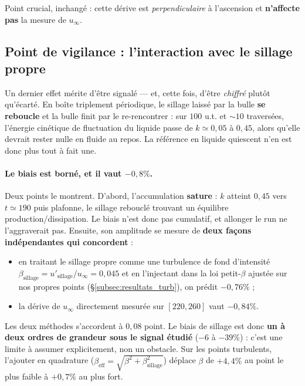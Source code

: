 Point crucial, inchangé : cette dérive est \emph{perpendiculaire} à l'ascension et
\textbf{n'affecte pas} la mesure de $u_\infty$.

\subsection{Point de vigilance : l'interaction avec le sillage propre}

Un dernier effet mérite d'être signalé --- et, cette fois, d'être \emph{chiffré}
plutôt qu'écarté. En boîte triplement périodique, le sillage laissé par la bulle
\textbf{se reboucle} et la bulle finit par le re-rencontrer : sur $100$ u.t. et
${\sim}10$ traversées, l'énergie cinétique de fluctuation du liquide passe de
$k\simeq0{,}05$ à $0{,}45$, alors qu'elle devrait rester nulle en fluide au repos.
La \og{}référence en liquide quiescent\fg{} n'en est donc plus tout à fait une.

\paragraph{Le biais est borné, et il vaut $-0{,}8\%$.} Deux points le montrent.
D'abord, l'accumulation \textbf{sature} : $k$ atteint $0{,}45$ vers $t\simeq190$ puis
plafonne, le sillage rebouclé trouvant un équilibre production/dissipation. Le biais
n'est donc pas cumulatif, et allonger le run ne l'aggraverait pas. Ensuite, son
amplitude se mesure de \textbf{deux façons indépendantes qui concordent} :
\begin{itemize}
    \item en traitant le sillage propre comme une turbulence de fond d'intensité
    $\beta_{\text{sillage}}=u'_{\text{sillage}}/u_\infty=0{,}045$ et en l'injectant
    dans la loi petit-$\beta$ ajustée sur nos propres points
    (\S\ref{subsec:resultats_turb}), on prédit $-0{,}76\%$ ;
    \item la dérive de $u_\infty$ directement mesurée sur $[220,260]$ vaut
    $-0{,}84\%$.
\end{itemize}
Les deux méthodes s'accordent à $0{,}08$ point. Le biais de sillage est donc
\textbf{un à deux ordres de grandeur sous le signal étudié} ($-6$ à $-39\%$) :
c'est une limite à assumer explicitement, non un obstacle. Sur les points turbulents,
l'ajouter en quadrature ($\beta_{\text{eff}}=\sqrt{\beta^2+\beta_{\text{sillage}}^2}$)
déplace $\beta$ de $+4{,}4\%$ au point le plus faible à $+0{,}7\%$ au plus fort.

